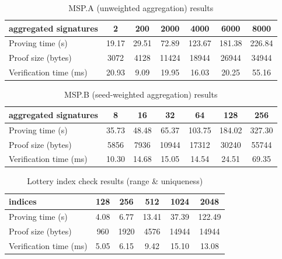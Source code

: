 \documentclass{article}
\begin{document}
\begin{table}[htbp]
  \centering
  \caption{MSP.A (unweighted aggregation) results}
  \renewcommand{\arraystretch}{0.9}
  \setlength{\tabcolsep}{10pt}
  \begin{tabular}{lcccccc}
    \toprule
    \textbf{aggregated signatures} & \textbf{2} & \textbf{200} & \textbf{2000} & \textbf{4000} & \textbf{6000} & \textbf{8000} \\
    \midrule
    Proving time (s)     & 19.17 & 29.51 & 72.89 & 123.67 & 181.38 & 226.84 \\
    Proof size (bytes)   & 3072  & 4128  & 11424 & 18944  & 26944  & 34944  \\
    Verification time (ms) & 20.93 & 9.09  & 19.95 & 16.03  & 20.25  & 55.16  \\
    \bottomrule
  \end{tabular}
  \label{tab:mspa_benchmark_en}
\end{table}


\begin{table}[htbp]
  \centering
  \caption{MSP.B (seed-weighted aggregation) results}
  \renewcommand{\arraystretch}{0.9}
  \setlength{\tabcolsep}{10pt}
  \begin{tabular}{lcccccc}
    \toprule
    \textbf{aggregated signatures} & \textbf{8} & \textbf{16} & \textbf{32} & \textbf{64} & \textbf{128} & \textbf{256} \\
    \midrule
    Proving time (s)     & 35.73 & 48.48 & 65.37 & 103.75 & 184.02 & 327.30 \\
    Proof size (bytes)   & 5856  & 7936  & 10944 & 17312  & 30240  & 55744  \\
    Verification time (ms) & 10.30 & 14.68 & 15.05 & 14.54 & 24.51  & 69.35  \\
    \bottomrule
  \end{tabular}
  \label{tab:mspb_benchmark_en}
\end{table}


\begin{table}[htbp]
  \centering
  \caption{Lottery index check results (range \& uniqueness)}
  \renewcommand{\arraystretch}{0.9}
  \setlength{\tabcolsep}{10pt}
  \begin{tabular}{lccccc}
    \toprule
    \textbf{indices} & \textbf{128} & \textbf{256} & \textbf{512} & \textbf{1024} & \textbf{2048} \\
    \midrule
    Proving time (s)     & 4.08 & 6.77  & 13.41 & 37.39 & 122.49 \\
    Proof size (bytes)   & 960  & 1920  & 4576  & 14944 & 14944 \\
    Verification time (ms) & 5.05 & 6.15 & 9.42  & 15.10 & 13.08 \\
    \bottomrule
  \end{tabular}
  \label{tab:index_check_benchmark_en}
\end{table}
\end{document}
